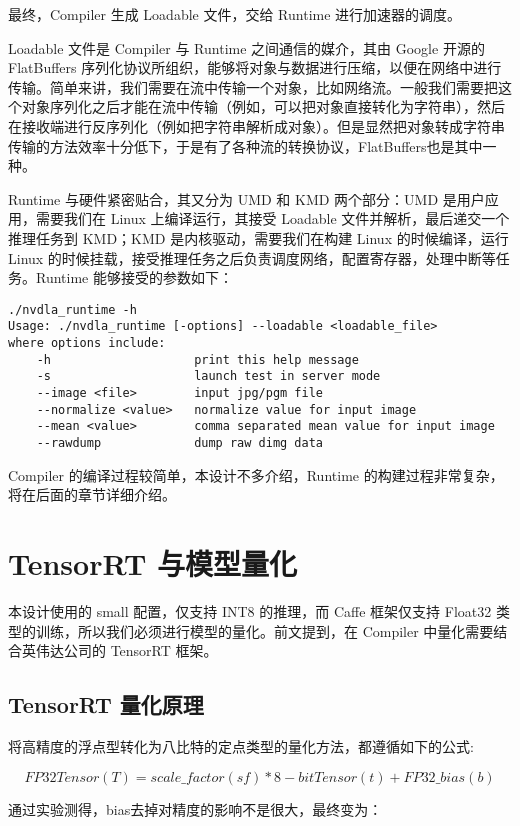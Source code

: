 最终，Compiler 生成 Loadable 文件，交给 Runtime 进行加速器的调度。

Loadable 文件是 Compiler 与 Runtime 之间通信的媒介，其由 Google 开源的 FlatBuffers 序列化协议所组织，能够将对象与数据进行压缩，以便在网络中进行传输。简单来讲，我们需要在流中传输一个对象，比如网络流。一般我们需要把这个对象序列化之后才能在流中传输（例如，可以把对象直接转化为字符串），然后在接收端进行反序列化（例如把字符串解析成对象）。但是显然把对象转成字符串传输的方法效率十分低下，于是有了各种流的转换协议，FlatBuffers也是其中一种。

Runtime 与硬件紧密贴合，其又分为 UMD 和 KMD 两个部分：UMD 是用户应用，需要我们在 Linux 上编译运行，其接受 Loadable 文件并解析，最后递交一个推理任务到 KMD；KMD 是内核驱动，需要我们在构建 Linux 的时候编译，运行 Linux 的时候挂载，接受推理任务之后负责调度网络，配置寄存器，处理中断等任务。Runtime 能够接受的参数如下：

\begin{lstlisting}
./nvdla_runtime -h
Usage: ./nvdla_runtime [-options] --loadable <loadable_file>
where options include:
    -h                    print this help message
    -s                    launch test in server mode
    --image <file>        input jpg/pgm file
    --normalize <value>   normalize value for input image
    --mean <value>        comma separated mean value for input image
    --rawdump             dump raw dimg data
\end{lstlisting}

Compiler 的编译过程较简单，本设计不多介绍，Runtime 的构建过程非常复杂，将在后面的章节详细介绍。

\section{TensorRT 与模型量化}

本设计使用的 small 配置，仅支持 INT8 的推理，而 Caffe 框架仅支持 Float32 类型的训练，所以我们必须进行模型的量化。前文提到，在 Compiler 中量化需要结合英伟达公司的 TensorRT 框架。

\subsection{TensorRT 量化原理}

将高精度的浮点型转化为八比特的定点类型的量化方法，都遵循如下的公式:

$$ FP32 Tensor (T) = scale\_factor(sf) * 8-bit Tensor(t) + FP32\_bias (b) $$

通过实验测得，bias去掉对精度的影响不是很大，最终变为：


